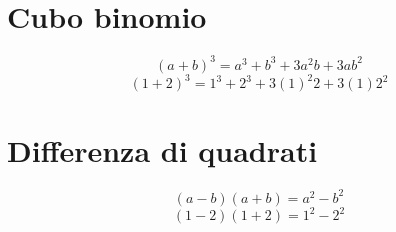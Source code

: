 \section{Cubo binomio}
\begin{equation*}
(a+b)^3=a^3+b^3+3a^2b+3ab^2
\end{equation*}
\begin{equation*}
(1+2)^3=1^3+2^3+3(1)^2 2+3(1)2^2
\end{equation*}
\section{Differenza di quadrati}
\begin{equation*}
(a-b)(a+b)=a^2-b^2
\end{equation*}
\begin{equation*}
(1-2)(1+2)=1^2-2^2
\end{equation*}
